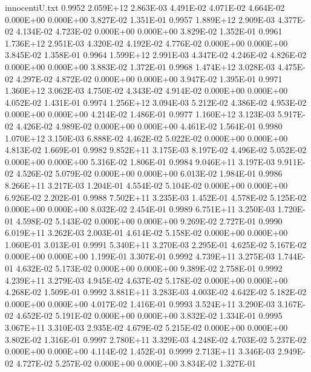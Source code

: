 \begin{filecontents}{innocentiU.txt}
0.9952 2.059E+12 2.863E-03 4.491E-02 4.071E-02 4.664E-02 0.000E+00 0.000E+00 3.827E-02 1.351E-01
0.9957 1.889E+12 2.909E-03 4.377E-02 4.134E-02 4.723E-02 0.000E+00 0.000E+00 3.829E-02 1.352E-01
0.9961 1.736E+12 2.951E-03 4.320E-02 4.192E-02 4.776E-02 0.000E+00 0.000E+00 3.845E-02 1.358E-01
0.9964 1.599E+12 2.991E-03 4.347E-02 4.246E-02 4.826E-02 0.000E+00 0.000E+00 3.883E-02 1.372E-01
0.9968 1.474E+12 3.028E-03 4.475E-02 4.297E-02 4.872E-02 0.000E+00 0.000E+00 3.947E-02 1.395E-01
0.9971 1.360E+12 3.062E-03 4.750E-02 4.343E-02 4.914E-02 0.000E+00 0.000E+00 4.052E-02 1.431E-01
0.9974 1.256E+12 3.094E-03 5.212E-02 4.386E-02 4.953E-02 0.000E+00 0.000E+00 4.214E-02 1.486E-01
0.9977 1.160E+12 3.123E-03 5.917E-02 4.426E-02 4.989E-02 0.000E+00 0.000E+00 4.461E-02 1.564E-01
0.9980 1.070E+12 3.150E-03 6.888E-02 4.462E-02 5.022E-02 0.000E+00 0.000E+00 4.813E-02 1.669E-01
0.9982 9.852E+11 3.175E-03 8.197E-02 4.496E-02 5.052E-02 0.000E+00 0.000E+00 5.316E-02 1.806E-01
0.9984 9.046E+11 3.197E-03 9.911E-02 4.526E-02 5.079E-02 0.000E+00 0.000E+00 6.013E-02 1.984E-01
0.9986 8.266E+11 3.217E-03 1.204E-01 4.554E-02 5.104E-02 0.000E+00 0.000E+00 6.926E-02 2.202E-01
0.9988 7.502E+11 3.235E-03 1.452E-01 4.578E-02 5.125E-02 0.000E+00 0.000E+00 8.032E-02 2.454E-01
0.9989 6.751E+11 3.250E-03 1.720E-01 4.598E-02 5.143E-02 0.000E+00 0.000E+00 9.269E-02 2.727E-01
0.9990 6.019E+11 3.262E-03 2.003E-01 4.614E-02 5.158E-02 0.000E+00 0.000E+00 1.060E-01 3.013E-01
0.9991 5.340E+11 3.270E-03 2.295E-01 4.625E-02 5.167E-02 0.000E+00 0.000E+00 1.199E-01 3.307E-01
0.9992 4.739E+11 3.275E-03 1.744E-01 4.632E-02 5.173E-02 0.000E+00 0.000E+00 9.389E-02 2.758E-01
0.9992 4.239E+11 3.279E-03 4.945E-02 4.637E-02 5.178E-02 0.000E+00 0.000E+00 4.268E-02 1.509E-01
0.9992 3.881E+11 3.283E-03 4.003E-02 4.642E-02 5.182E-02 0.000E+00 0.000E+00 4.017E-02 1.416E-01
0.9993 3.524E+11 3.290E-03 3.167E-02 4.652E-02 5.191E-02 0.000E+00 0.000E+00 3.832E-02 1.334E-01
0.9995 3.067E+11 3.310E-03 2.935E-02 4.679E-02 5.215E-02 0.000E+00 0.000E+00 3.802E-02 1.316E-01
0.9997 2.780E+11 3.329E-03 4.248E-02 4.703E-02 5.237E-02 0.000E+00 0.000E+00 4.114E-02 1.452E-01
0.9999 2.713E+11 3.346E-03 2.949E-02 4.727E-02 5.257E-02 0.000E+00 0.000E+00 3.834E-02 1.327E-01
\end{filecontents}

